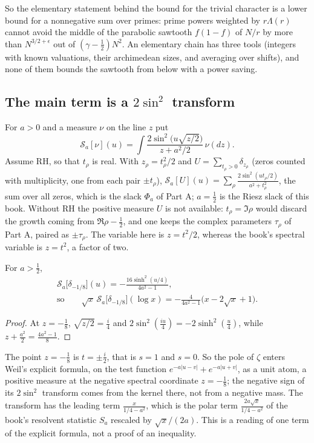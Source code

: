 So the elementary statement behind the bound for the trivial character is a lower bound for a nonnegative sum over primes: prime powers weighted by $r\Lambda(r)$ cannot avoid the middle of the parabolic sawtooth $f(1-f)$ of $N/r$ by more than $N^{3/2+\epsilon}$ out of $(\gamma-\frac12)N^2$. An elementary chain has three tools (integers with known valuations, their archimedean sizes, and averaging over shifts), and none of them bounds the sawtooth from below with a power saving.

\subsection{The main term is a $2\sin^2$ transform}\label{mql:sub:sin2}

For $a>0$ and a measure $\nu$ on the line $z$ put
\[
\mathcal S_a[\nu](u)=\int\frac{2\sin^2\!\big(u\sqrt{z/2}\big)}{z+a^2/2}\,\nu(dz).
\]
Assume RH, so that $t_\rho$ is real. With $z_\rho=t_\rho^2/2$ and $U=\sum_{t_\rho>0}\delta_{z_\rho}$ (zeros counted with multiplicity, one from each pair $\pm t_\rho$), $\mathcal S_a[U](u)=\sum_\rho\frac{2\sin^2(ut_\rho/2)}{a^2+t_\rho^2}$, the sum over all zeros, which is the slack $\Phi_a$ of Part A; $a=\frac12$ is the Riesz slack of this book. Without RH the positive measure $U$ is not available: $t_\rho=\Im\rho$ would discard the growth coming from $\Re\rho-\frac12$, and one keeps the complex parameters $\tau_\rho$ of Part A, paired as $\pm\tau_\rho$. The variable here is $z=t^2/2$, whereas the book's spectral variable is $z=t^2$, a factor of two.

\begin{proposition}\label{mql:prop:atom}
For $a>\frac12$,
\begin{gather*}
\mathcal S_a\big[\delta_{-1/8}\big](u)=-\frac{16\sinh^2(u/4)}{4a^2-1},\\\text{so}\qquad\sqrt x\,\mathcal S_a\big[\delta_{-1/8}\big](\log x)=-\frac{4}{4a^2-1}\big(x-2\sqrt x+1\big).
\end{gather*}
\end{proposition}

\begin{proof}
At $z=-\frac18$, $\sqrt{z/2}=\frac i4$ and $2\sin^2(\frac{iu}4)=-2\sinh^2(\frac u4)$, while $z+\frac{a^2}2=\frac{4a^2-1}8$.
\end{proof}

The point $z=-\frac18$ is $t=\pm\frac i2$, that is $s=1$ and $s=0$. So the pole of $\zeta$ enters Weil's explicit formula, on the test function $e^{-a|u-v|}+e^{-a|u+v|}$, as a unit atom, a positive measure at the negative spectral coordinate $z=-\frac18$; the negative sign of its $2\sin^2$ transform comes from the kernel there, not from a negative mass. The transform has the leading term $\frac{x}{1/4-a^2}$, which is the polar term $\frac{2a\sqrt x}{1/4-a^2}$ of the book's resolvent statistic $S_a$ rescaled by $\sqrt x/(2a)$. This is a reading of one term of the explicit formula, not a proof of an inequality.

